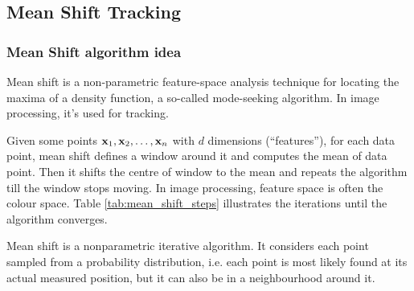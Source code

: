 \documentclass[a4paper]{article}
\begin{document}
\subsection{Mean Shift Tracking}


\subsubsection{Mean Shift algorithm idea}

Mean shift is a non-parametric feature-space analysis technique for locating the maxima of a density function, a so-called mode-seeking algorithm. In image processing, it's used for tracking.

Given some points $\textbf{x}_1, \textbf{x}_2, \ldots, \textbf{x}_n$ with $d$ dimensions (``features''), for each data point, mean shift defines a window around it
and computes the mean of data point. Then it shifts the centre of window to the mean and repeats the algorithm till the window stops moving. In image processing, feature space is often the colour space. Table \ref{tab:mean_shift_steps} illustrates the iterations until the algorithm converges.

Mean shift is a nonparametric iterative algorithm. It considers each point sampled from a probability distribution, i.e. each point is most likely found at its actual measured position, but it can also be in a neighbourhood around it.

\end{document}
